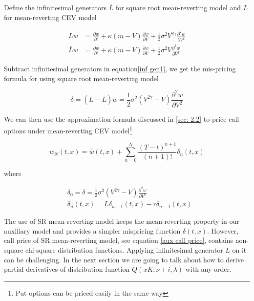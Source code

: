 Define the infinitesimal generators $\bar{L}$ for square root mean-reverting model and $L$ for mean-reverting CEV model

\begin{equation}\label{inf gen1}
    \begin{aligned}
        L w&= \frac{\partial w}{\partial t}+\kappa(m - V) \frac{\partial w}{\partial V}+\frac{1}{2} \sigma^{2} V^{2\gamma} \frac{\partial^{2} w}{\partial V^{2}} \\
        \bar{L} w &= \frac{\partial w}{\partial t}+\kappa(m - V) \frac{\partial w}{\partial V}+\frac{1}{2} \sigma^{2} V \frac{\partial^{2} w}{\partial V^{2}}
    \end{aligned}
\end{equation}

Subtract infinitesimal generators in equation\eqref{inf gen1}, we get the mis-pricing formula for using square root mean-reverting model

$$
\delta = (L - \bar{L}) \bar{w} = \frac{1}{2} \sigma^{2} (V^{2\gamma} - V) \frac{\partial^{2} w}{\partial V^{2}}
$$

\noindent We can then use the approximation formula discussed in \ref{sec: 2.2} to price call options under mean-reverting CEV model\footnote{Put options can be priced easily in the same way}

\begin{equation} \label{cev approx formula}
    w_{N}(t, x)=\bar{w}(t,x)+\sum_{n=0}^{N} \frac{(T-t)^{n+1}}{(n+1) !} \delta_{n}(t, x)
\end{equation}

\noindent where

\begin{equation}\label{mispricing}
    \begin{aligned}
        &\delta_0 = \delta = \frac{1}{2} \sigma^{2} (V^{2\gamma} - V) \frac{\partial^{2} w}{\partial V^{2}} \\
        &\delta_{n}(t, x)=L \delta_{n-1}(t, x)- r\delta_{n-1}(t, x)
        \end{aligned}
\end{equation}

The use of SR mean-reverting model keeps the mean-reverting property in our auxiliary model and provides a simpler mispricing function $\delta(t,x)$. However, call price of SR mean-reverting model, see equation \eqref{aux call price}, contains non-square chi-square distribution functions. Applying infinitesimal generator $L$ on it can be challenging. In the next section we are going to talk about how to derive partial derivatives of distribution function $Q(xK; \nu+i, \lambda)$ with any order.

